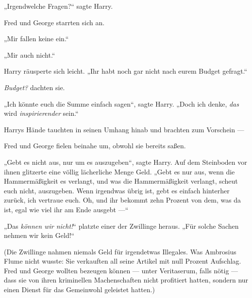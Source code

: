 „Irgendwelche Fragen?“ sagte Harry.

Fred und George starrten sich an.

„Mir fallen keine ein.“

„Mir auch nicht.“

Harry räusperte sich leicht.
„Ihr habt noch gar nicht nach eurem Budget gefragt.“

\emph{Budget?} dachten sie.

„Ich könnte euch die Summe einfach sagen“, sagte Harry.
„Doch ich denke, \emph{das} wird \emph{inspirierender} sein.“

Harrys Hände tauchten in seinen Umhang hinab und brachten zum Vorschein —

Fred und George fielen beinahe um, obwohl sie bereits saßen.

„Gebt es nicht aus, nur um es auszugeben“, sagte Harry. Auf dem Steinboden vor ihnen glitzerte eine völlig lächerliche Menge Geld.
„Gebt es nur aus, wenn die Hammermäßigkeit es verlangt, und was die Hammermäßigkeit verlangt, scheut euch nicht, auszugeben. Wenn irgendwas übrig ist, gebt es einfach hinterher zurück, ich vertraue euch. Oh, und ihr bekommt zehn Prozent von dem, was da ist, egal wie viel ihr am Ende ausgebt —“

„Das \emph{können wir nicht!}“ platzte einer der Zwillinge heraus.
„Für solche Sachen nehmen wir kein Geld!“

(Die Zwillinge nahmen niemals Geld für irgendetwas Illegales. Was Ambrosius Flume nicht wusste: Sie verkauften all seine Artikel mit null Prozent Aufschlag. Fred und George wollten bezeugen können — unter Veritaserum, falls nötig — dass sie von ihren kriminellen Machenschaften nicht profitiert hatten, sondern nur einen Dienst für das Gemeinwohl geleistet hatten.)

